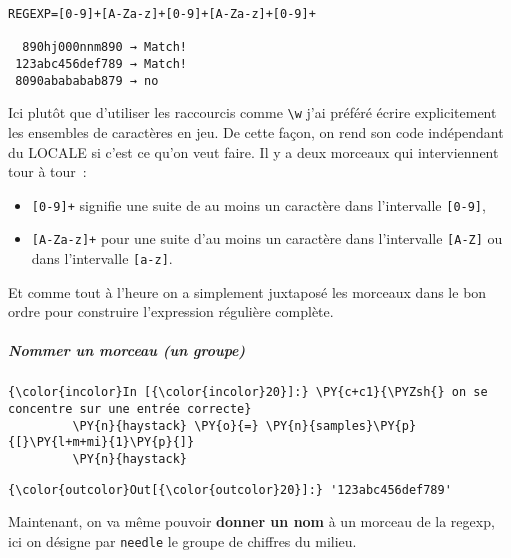     \begin{Verbatim}[commandchars=\\\{\},frame=single,framerule=0.3mm,rulecolor=\color{cellframecolor}]
REGEXP=[0-9]+[A-Za-z]+[0-9]+[A-Za-z]+[0-9]+

  890hj000nnm890 → Match!
 123abc456def789 → Match!
 8090abababab879 → no
\end{Verbatim}

    Ici plutôt que d'utiliser les raccourcis comme
\texttt{\textbackslash{}w} j'ai préféré écrire explicitement les
ensembles de caractères en jeu. De cette façon, on rend son code
indépendant du LOCALE si c'est ce qu'on veut faire. Il y a deux morceaux
qui interviennent tour à tour~:

\begin{itemize}
\tightlist
\item
  \texttt{{[}0-9{]}+} signifie une suite de au moins un caractère dans
  l'intervalle \texttt{{[}0-9{]}},
\item
  \texttt{{[}A-Za-z{]}+} pour une suite d'au moins un caractère dans
  l'intervalle \texttt{{[}A-Z{]}} ou dans l'intervalle
  \texttt{{[}a-z{]}}.
\end{itemize}

Et comme tout à l'heure on a simplement juxtaposé les morceaux dans le
bon ordre pour construire l'expression régulière complète.

    \hypertarget{nommer-un-morceau-un-groupe}{%
\subparagraph{Nommer un morceau (un
groupe)}\label{nommer-un-morceau-un-groupe}}

    \begin{Verbatim}[commandchars=\\\{\},frame=single,framerule=0.3mm,rulecolor=\color{cellframecolor}]
{\color{incolor}In [{\color{incolor}20}]:} \PY{c+c1}{\PYZsh{} on se concentre sur une entrée correcte}
         \PY{n}{haystack} \PY{o}{=} \PY{n}{samples}\PY{p}{[}\PY{l+m+mi}{1}\PY{p}{]}
         \PY{n}{haystack}
\end{Verbatim}


\begin{Verbatim}[commandchars=\\\{\},frame=single,framerule=0.3mm,rulecolor=\color{cellframecolor}]
{\color{outcolor}Out[{\color{outcolor}20}]:} '123abc456def789'
\end{Verbatim}
            
    Maintenant, on va même pouvoir \textbf{donner un nom} à un morceau de la
regexp, ici on désigne par \texttt{needle} le groupe de chiffres du
milieu.

